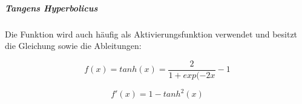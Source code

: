 \subparagraph{Tangens Hyperbolicus}
Die Funktion wird auch häufig als Aktivierungsfunktion verwendet und besitzt die Gleichung sowie die Ableitungen: 

\begin{equation}
f(x) = tanh(x) = \frac{2}{1+exp(-2x}-1
\end{equation}

\begin{equation}
f'(x) = 1 - tanh^2(x)
\end{equation}


